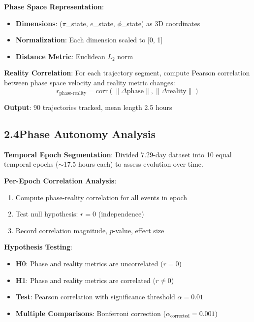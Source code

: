 \documentclass[11pt]{article}
\begin{document}
\noindent\textbf{Phase Space Representation}:
\begin{itemize}
    \item \textbf{Dimensions}: ($\pi$\_state, $e$\_state, $\phi$\_state) as 3D coordinates
    \item \textbf{Normalization}: Each dimension scaled to [0, 1]
    \item \textbf{Distance Metric}: Euclidean $L_2$ norm
\end{itemize}

\noindent\textbf{Reality Correlation}: For each trajectory segment, compute Pearson correlation between phase space velocity and reality metric changes:
\begin{equation}
r_{\text{phase-reality}} = \text{corr}(\|\Delta\text{phase}\|, \|\Delta\text{reality}\|)
\end{equation}

\noindent\textbf{Output}: 90 trajectories tracked, mean length 2.5 hours

\subsection*{2.4\quad Phase Autonomy Analysis}

\noindent\textbf{Temporal Epoch Segmentation}: Divided 7.29-day dataset into 10 equal temporal epochs ($\sim$17.5 hours each) to assess evolution over time.

\noindent\textbf{Per-Epoch Correlation Analysis}:
\begin{enumerate}
    \item Compute phase-reality correlation for all events in epoch
    \item Test null hypothesis: $r = 0$ (independence)
    \item Record correlation magnitude, $p$-value, effect size
\end{enumerate}

\noindent\textbf{Hypothesis Testing}:
\begin{itemize}
    \item \textbf{H0}: Phase and reality metrics are uncorrelated ($r = 0$)
    \item \textbf{H1}: Phase and reality metrics are correlated ($r \neq 0$)
    \item \textbf{Test}: Pearson correlation with significance threshold $\alpha = 0.01$
    \item \textbf{Multiple Comparisons}: Bonferroni correction ($\alpha_{\text{corrected}} = 0.001$)
\end{itemize}
\end{document}

